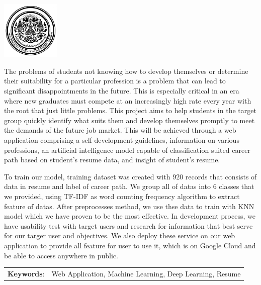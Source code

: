 \documentclass[12pt,oneside,openright,a4paper]{cpe-thai-project}
\begin{document}
\pdfstringdefDisableCommands{%
    \let\MakeUppercase\relax
}

\begin{center}
    \includegraphics[width=2.8cm]{logo02.jpg}
\end{center}
\vspace*{-1cm}

\maketitlepage
\makesignaturepage

\abstract

The problems of students not knowing how to develop themselves or determine their suitability for a particular profession
is a problem that can lead to significant disappointments in the future. This is especially critical in an era where new graduates
must compete at an increasingly high rate every year with the root that just little problems. This project aims to help students in
the target group quickly identify what suits them and develop themselves promptly to meet the demands of the future job market.
This will be achieved through a web application comprising a self-development guidelines, information on various professions,
an artificial intelligence model capable of classification suited career path based on student's resume data, and insight of student's resume.

To train our model, training dataset was created with 920 records that consists of data in resume and label of career path.
We group all of datas into 6 classes that we provided, using TF-IDF as word counting frequency algorithm to extract feature of datas.
After preprocesses method, we use thse data to train with KNN model which we have proven to be the most effective.
In development process, we have usability test with target users and research for information that best serve for our targer user and objectives.
We also deploy these service on our web application to provide all feature for user to use it, which is on Google Cloud and be able to access anywhere in public.


\begin{flushleft}
    \begin{tabular*}{\textwidth}{@{}lp{}}
        \textbf{Keywords}: & Web Application, Machine Learning, Deep Learning, Resume
    \end{tabular*}
\end{flushleft}
\endabstract
\end{document}
